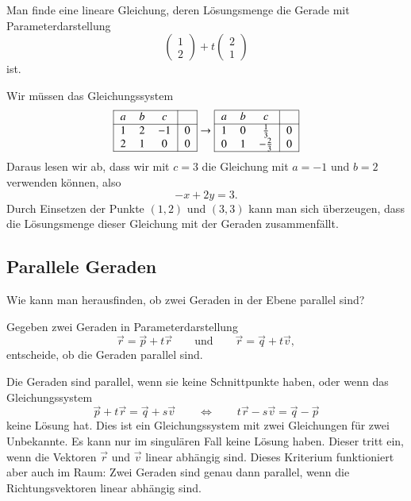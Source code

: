 \begin{beispiel}
Man finde eine lineare Gleichung, deren Lösungsmenge die Gerade mit
Parameterdarstellung
\[
\begin{pmatrix} 1\\2\end{pmatrix} + t\begin{pmatrix}2\\1\end{pmatrix}
\]
ist.
\smallskip

Wir müssen das Gleichungssystem
\[
\begin{tabular}{|>{$}c<{$}>{$}c<{$}>{$}c<{$}|>{$}c<{$}|}
\hline
a&b&c&\\
\hline
1&2&-1&0\\
2&1&0&0\\
\hline
\end{tabular}
\rightarrow
\begin{tabular}{|>{$}c<{$}>{$}c<{$}>{$}c<{$}|>{$}c<{$}|}
\hline
a&b&c&\\
\hline
1&0& \frac13&0\\
0&1&-\frac23&0\\
\hline
\end{tabular}
\]
Daraus lesen wir ab, dass wir mit $c=3$ die Gleichung mit $a=-1$ und $b=2$
verwenden können, also
\[
-x+2y=3.
\]
Durch Einsetzen der Punkte $(1,2)$ und $(3,3)$ kann man sich überzeugen,
dass die Lösungsmenge dieser Gleichung mit der Geraden zusammenfällt.
\qedhere
\end{beispiel}

%
%
\subsection{Parallele Geraden}
Wie kann man herausfinden, ob zwei Geraden in der Ebene parallel sind?

\begin{aufgabe}
Gegeben zwei Geraden in Parameterdarstellung
\[
\vec{r} = \vec{p} + t\vec{r}
\qquad\text{und}\qquad
\vec{r} = \vec{q} + t\vec{v},
\]
entscheide, ob die Geraden parallel sind.
\end{aufgabe}
Die Geraden sind parallel, wenn sie keine Schnittpunkte haben, oder
wenn das Gleichungssystem
\[
\vec{p} + t\vec{r}
=
\vec{q} + s\vec{v}
\qquad\Leftrightarrow\qquad
t\vec{r}
-
s\vec{v}
=
\vec{q}
-
\vec{p}
\]
keine Lösung hat.
Dies ist ein Gleichungssystem mit zwei Gleichungen für zwei Unbekannte.
Es kann nur im singulären Fall keine Lösung haben.
Dieser tritt ein, wenn die Vektoren $\vec{r}$ und $\vec{v}$
linear abhängig sind.
Dieses Kriterium funktioniert aber auch im Raum: Zwei Geraden sind
genau dann parallel, wenn die Richtungsvektoren linear abhängig sind.


